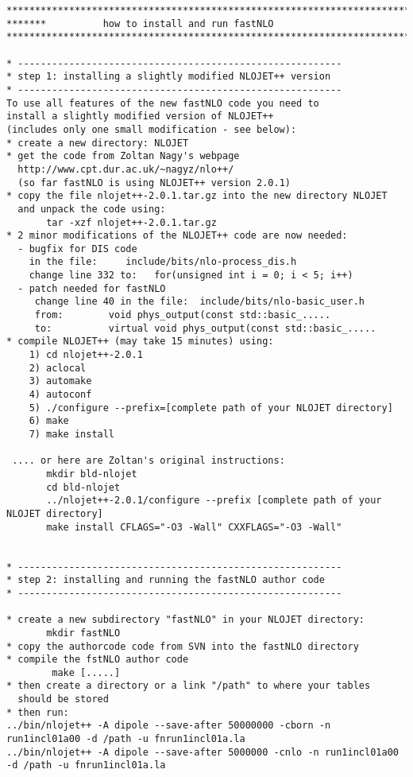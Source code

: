 {\small \footnotesize
\begin{verbatim} 
******************************************************************************
*******          how to install and run fastNLO 
******************************************************************************

* ---------------------------------------------------------
* step 1: installing a slightly modified NLOJET++ version
* ---------------------------------------------------------
To use all features of the new fastNLO code you need to
install a slightly modified version of NLOJET++
(includes only one small modification - see below):
* create a new directory: NLOJET
* get the code from Zoltan Nagy's webpage  
  http://www.cpt.dur.ac.uk/~nagyz/nlo++/
  (so far fastNLO is using NLOJET++ version 2.0.1)
* copy the file nlojet++-2.0.1.tar.gz into the new directory NLOJET 
  and unpack the code using:
       tar -xzf nlojet++-2.0.1.tar.gz
* 2 minor modifications of the NLOJET++ code are now needed:
  - bugfix for DIS code
    in the file:     include/bits/nlo-process_dis.h
    change line 332 to:   for(unsigned int i = 0; i < 5; i++)
  - patch needed for fastNLO
     change line 40 in the file:  include/bits/nlo-basic_user.h
     from:        void phys_output(const std::basic_..... 
     to:          virtual void phys_output(const std::basic_..... 
* compile NLOJET++ (may take 15 minutes) using:
    1) cd nlojet++-2.0.1
    2) aclocal
    3) automake
    4) autoconf
    5) ./configure --prefix=[complete path of your NLOJET directory]
    6) make
    7) make install

 .... or here are Zoltan's original instructions:
       mkdir bld-nlojet 
       cd bld-nlojet
       ../nlojet++-2.0.1/configure --prefix [complete path of your NLOJET directory]
       make install CFLAGS="-O3 -Wall" CXXFLAGS="-O3 -Wall"


* ---------------------------------------------------------
* step 2: installing and running the fastNLO author code
* ---------------------------------------------------------

* create a new subdirectory "fastNLO" in your NLOJET directory:
       mkdir fastNLO
* copy the authorcode code from SVN into the fastNLO directory
* compile the fstNLO author code
        make [.....]
* then create a directory or a link "/path" to where your tables 
  should be stored
* then run:
../bin/nlojet++ -A dipole --save-after 50000000 -cborn -n run1incl01a00 -d /path -u fnrun1incl01a.la
../bin/nlojet++ -A dipole --save-after 5000000 -cnlo -n run1incl01a00 -d /path -u fnrun1incl01a.la


\end{verbatim}}

